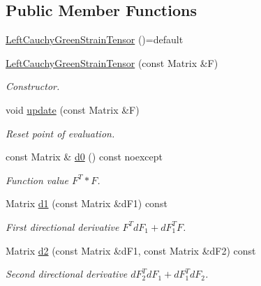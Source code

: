 \subsection*{Public Member Functions}
\begin{DoxyCompactItemize}
\item 
\hyperlink{classFunG_1_1LinearAlgebra_1_1LeftCauchyGreenStrainTensor_af76f7ef68cc45d0d96e3cecd67b14915}{Left\-Cauchy\-Green\-Strain\-Tensor} ()=default
\item 
\hyperlink{classFunG_1_1LinearAlgebra_1_1LeftCauchyGreenStrainTensor_aa93f7d040aa56744bd542ccb56bafa5c}{Left\-Cauchy\-Green\-Strain\-Tensor} (const Matrix \&F)
\begin{DoxyCompactList}\small\item\em Constructor. \end{DoxyCompactList}\item 
void \hyperlink{classFunG_1_1LinearAlgebra_1_1LeftCauchyGreenStrainTensor_a3db2fef2c9455dfe7f3bad1036b0d18a}{update} (const Matrix \&F)
\begin{DoxyCompactList}\small\item\em Reset point of evaluation. \end{DoxyCompactList}\item 
const Matrix \& \hyperlink{classFunG_1_1LinearAlgebra_1_1LeftCauchyGreenStrainTensor_a61ede5d83a98cf94898aedc503849a60}{d0} () const noexcept
\begin{DoxyCompactList}\small\item\em Function value $ F^T * F $. \end{DoxyCompactList}\item 
Matrix \hyperlink{classFunG_1_1LinearAlgebra_1_1LeftCauchyGreenStrainTensor_a4aea22c48162713fa53fdf62bd334356}{d1} (const Matrix \&d\-F1) const 
\begin{DoxyCompactList}\small\item\em First directional derivative $ F^T dF_1 + dF_1^T F $. \end{DoxyCompactList}\item 
Matrix \hyperlink{classFunG_1_1LinearAlgebra_1_1LeftCauchyGreenStrainTensor_a77922731eee119129696eda862cc88e0}{d2} (const Matrix \&d\-F1, const Matrix \&d\-F2) const 
\begin{DoxyCompactList}\small\item\em Second directional derivative $ dF_2^T dF_1 + dF_1^T dF_2 $. \end{DoxyCompactList}\end{DoxyCompactItemize}


